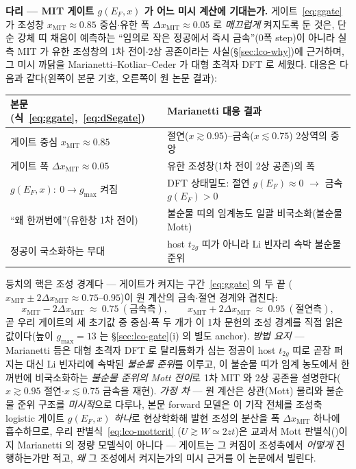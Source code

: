 \begin{srcbox}
\textbf{다리 --- MIT 게이트 $g(E_F,x)$ 가 어느 미시 계산에 기대는가.} 게이트~\eqref{eq:ggate} 가 조성창
$x_\mathrm{MIT}\!\approx\!0.85$ 중심$\cdot$유한 폭 $\Delta x_\mathrm{MIT}\!\approx\!0.05$ 로 \emph{매끄럽게}
켜지도록 둔 것은, 단순 강체 띠 채움이 예측하는 ``임의로 작은 정공에서 즉시 금속''(0폭 step)이 아니라 실측
MIT 가 유한 조성창의 1차 전이$\cdot$2상 공존이라는 사실(\S\ref{sec:lco-why})에 근거하며, 그 미시 까닭을
Marianetti--Kotliar--Ceder\cite{marianetti2004} 가 대형 초격자 DFT 로 세웠다. 대응은 다음과 같다(왼쪽이
본문 기호, 오른쪽이 원 논문 결과):
\begin{center}\footnotesize
\begin{tabular}{@{}ll@{}}
\hline
본문(식~\eqref{eq:ggate},~\eqref{eq:dSegate}) & Marianetti\cite{marianetti2004} 대응 결과 \\
\hline
게이트 중심 $x_\mathrm{MIT}\!\approx\!0.85$ & 절연($x\gtrsim0.95$)--금속($x\lesssim0.75$) 2상역의 중앙 \\
게이트 폭 $\Delta x_\mathrm{MIT}\!\approx\!0.05$ & 유한 조성창(1차 전이 2상 공존)의 폭 \\
$g(E_F,x)\!:\ 0\!\to\!g_{\max}$ 켜짐 & DFT 상태밀도: 절연 $g(E_F){\approx}0$ $\to$ 금속 $g(E_F){>}0$ \\
``왜 한꺼번에''(유한창 1차 전이) & 불순물 띠의 임계농도 일괄 비국소화(불순물 Mott) \\
정공이 국소화하는 무대 & host $t_{2g}$ 띠가 아니라 Li 빈자리 속박 불순물 준위 \\
\hline
\end{tabular}
\end{center}
등치의 핵은 조성 경계다 --- 게이트가 켜지는 구간~\eqref{eq:ggate} 의 두 끝
($x_\mathrm{MIT}\!\pm\!2\Delta x_\mathrm{MIT}\!\approx\!0.75$--$0.95$)이 원 계산의 금속$\cdot$절연 경계와
겹친다:
\begin{equation}
x_\mathrm{MIT}-2\Delta x_\mathrm{MIT}\ \approx\ 0.75\ (\text{금속측}),\qquad
x_\mathrm{MIT}+2\Delta x_\mathrm{MIT}\ \approx\ 0.95\ (\text{절연측}),
\label{eq:br-marianetti2004-1}
\end{equation}
곧 우리 게이트의 세 초기값 중 중심$\cdot$폭 두 개가 이 1차 문헌의 조성 경계를 직접 읽은 값이다(높이
$g_{\max}\!=\!13$ 는 \S\ref{sec:lco-gate}(i) 의 별도 anchor\cite{motohashi2009}). \emph{방법 요지} ---
Marianetti 등은 대형 초격자 DFT 로 탈리튬화가 심는 정공이 host $t_{2g}$ 띠로 곧장 퍼지는 대신 Li
빈자리에 속박된 \emph{불순물 준위}를 이루고, 이 불순물 띠가 임계 농도에서 한꺼번에 비국소화하는
\emph{불순물 준위의 Mott 전이}로 1차 MIT 와 2상 공존을 설명한다($x\gtrsim0.95$ 절연$\cdot$$x\lesssim0.75$
금속을 재현). \emph{가정 차} --- 원 계산은 상관(Mott) 물리와 불순물 준위 구조를 \emph{미시적}으로 다루나,
본문 forward 모델은 이 기작 전체를 조성축 logistic 게이트 $g(E_F,x)$ \emph{하나}로 현상학화해 발현
조성의 분산을 폭 $\Delta x_\mathrm{MIT}$ 하나에 흡수하므로, 우리 판별식~\eqref{eq:lco-mottcrit}
($U\!\gtrsim\!W\!\simeq\!2zt$)은 교과서 Mott 판별식(\cite{mott1968,imada1998})이지 Marianetti 의 정량
모델식이 아니다 --- 게이트는 그 켜짐이 조성축에서 \emph{어떻게} 진행하는가만 적고, \emph{왜} 그
조성에서 켜지는가의 미시 근거를 이 논문에서 빌린다.
\end{srcbox}

